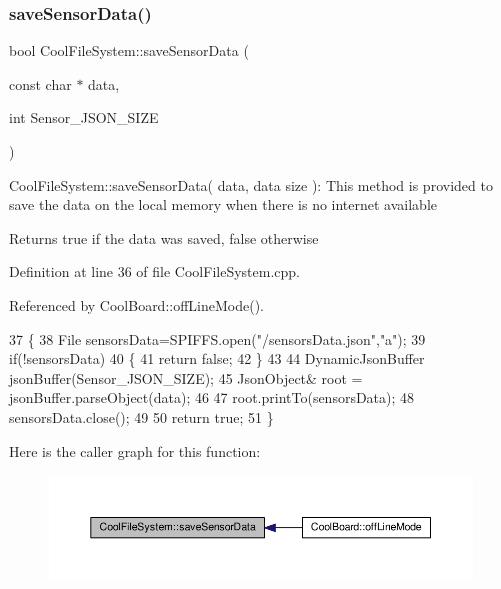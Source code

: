 \subsubsection{\texorpdfstring{save\+Sensor\+Data()}{saveSensorData()}}
{\footnotesize\ttfamily bool Cool\+File\+System\+::save\+Sensor\+Data (\begin{DoxyParamCaption}\item[{const char $\ast$}]{data,  }\item[{int}]{Sensor\+\_\+\+J\+S\+O\+N\+\_\+\+S\+I\+ZE }\end{DoxyParamCaption})}

Cool\+File\+System\+::save\+Sensor\+Data( data, data size )\+: This method is provided to save the data on the local memory when there is no internet available

\begin{DoxyReturn}{Returns}
true if the data was saved, false otherwise 
\end{DoxyReturn}


Definition at line 36 of file Cool\+File\+System.\+cpp.



Referenced by Cool\+Board\+::off\+Line\+Mode().


\begin{DoxyCode}
37 \{
38     File sensorsData=SPIFFS.open(\textcolor{stringliteral}{"/sensorsData.json"},\textcolor{stringliteral}{"a"});
39     \textcolor{keywordflow}{if}(!sensorsData)
40     \{
41         \textcolor{keywordflow}{return} \textcolor{keyword}{false};   
42     \}   
43 
44     DynamicJsonBuffer jsonBuffer(Sensor\_JSON\_SIZE);
45     JsonObject& root = jsonBuffer.parseObject(data);
46     
47     root.printTo(sensorsData);
48     sensorsData.close();
49     
50     \textcolor{keywordflow}{return} \textcolor{keyword}{true};        
51 \}
\end{DoxyCode}
Here is the caller graph for this function\+:
\nopagebreak
\begin{figure}[H]
\begin{center}
\leavevmode
\includegraphics[width=350pt]{classCoolFileSystem_a4c560c2ddd40b74b7758e6ceb2c58957_icgraph}
\end{center}
\end{figure}
\mbox{\label{classCoolFileSystem_a32dad79ae80182a83e2e8f52286b7c7b}} 
